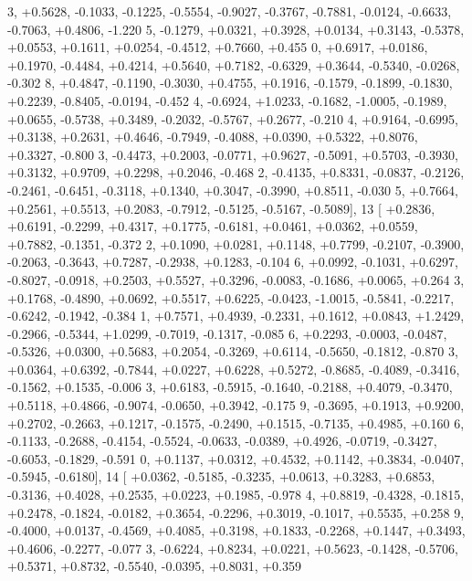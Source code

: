 \begin{DoxyCode}
      3, +0.5628, -0.1033, -0.1225, -0.5554, -0.9027, -0.3767, -0.7881, -0.0124, -0.6633, -0.7063, +0.4806, -1.220
      5, -0.1279, +0.0321, +0.3928, +0.0134, +0.3143, -0.5378, +0.0553, +0.1611, +0.0254, -0.4512, +0.7660, +0.455
      0, +0.6917, +0.0186, +0.1970, -0.4484, +0.4214, +0.5640, +0.7182, -0.6329, +0.3644, -0.5340, -0.0268, -0.302
      8, +0.4847, -0.1190, -0.3030, +0.4755, +0.1916, -0.1579, -0.1899, -0.1830, +0.2239, -0.8405, -0.0194, -0.452
      4, -0.6924, +1.0233, -0.1682, -1.0005, -0.1989, +0.0655, -0.5738, +0.3489, -0.2032, -0.5767, +0.2677, -0.210
      4, +0.9164, -0.6995, +0.3138, +0.2631, +0.4646, -0.7949, -0.4088, +0.0390, +0.5322, +0.8076, +0.3327, -0.800
      3, -0.4473, +0.2003, -0.0771, +0.9627, -0.5091, +0.5703, -0.3930, +0.3132, +0.9709, +0.2298, +0.2046, -0.468
      2, -0.4135, +0.8331, -0.0837, -0.2126, -0.2461, -0.6451, -0.3118, +0.1340, +0.3047, -0.3990, +0.8511, -0.030
      5, +0.7664, +0.2561, +0.5513, +0.2083, -0.7912, -0.5125, -0.5167, -0.5089],
13 [ +0.2836, +0.6191, -0.2299, +0.4317, +0.1775, -0.6181, +0.0461, +0.0362, +0.0559, +0.7882, -0.1351, -0.372
      2, +0.1090, +0.0281, +0.1148, +0.7799, -0.2107, -0.3900, -0.2063, -0.3643, +0.7287, -0.2938, +0.1283, -0.104
      6, +0.0992, -0.1031, +0.6297, -0.8027, -0.0918, +0.2503, +0.5527, +0.3296, -0.0083, -0.1686, +0.0065, +0.264
      3, +0.1768, -0.4890, +0.0692, +0.5517, +0.6225, -0.0423, -1.0015, -0.5841, -0.2217, -0.6242, -0.1942, -0.384
      1, +0.7571, +0.4939, -0.2331, +0.1612, +0.0843, +1.2429, -0.2966, -0.5344, +1.0299, -0.7019, -0.1317, -0.085
      6, +0.2293, -0.0003, -0.0487, -0.5326, +0.0300, +0.5683, +0.2054, -0.3269, +0.6114, -0.5650, -0.1812, -0.870
      3, +0.0364, +0.6392, -0.7844, +0.0227, +0.6228, +0.5272, -0.8685, -0.4089, -0.3416, -0.1562, +0.1535, -0.006
      3, +0.6183, -0.5915, -0.1640, -0.2188, +0.4079, -0.3470, +0.5118, +0.4866, -0.9074, -0.0650, +0.3942, -0.175
      9, -0.3695, +0.1913, +0.9200, +0.2702, -0.2663, +0.1217, -0.1575, -0.2490, +0.1515, -0.7135, +0.4985, +0.160
      6, -0.1133, -0.2688, -0.4154, -0.5524, -0.0633, -0.0389, +0.4926, -0.0719, -0.3427, -0.6053, -0.1829, -0.591
      0, +0.1137, +0.0312, +0.4532, +0.1142, +0.3834, -0.0407, -0.5945, -0.6180],
14 [ +0.0362, -0.5185, -0.3235, +0.0613, +0.3283, +0.6853, -0.3136, +0.4028, +0.2535, +0.0223, +0.1985, -0.978
      4, +0.8819, -0.4328, -0.1815, +0.2478, -0.1824, -0.0182, +0.3654, -0.2296, +0.3019, -0.1017, +0.5535, +0.258
      9, -0.4000, +0.0137, -0.4569, +0.4085, +0.3198, +0.1833, -0.2268, +0.1447, +0.3493, +0.4606, -0.2277, -0.077
      3, -0.6224, +0.8234, +0.0221, +0.5623, -0.1428, -0.5706, +0.5371, +0.8732, -0.5540, -0.0395, +0.8031, +0.359

\end{DoxyCode}
